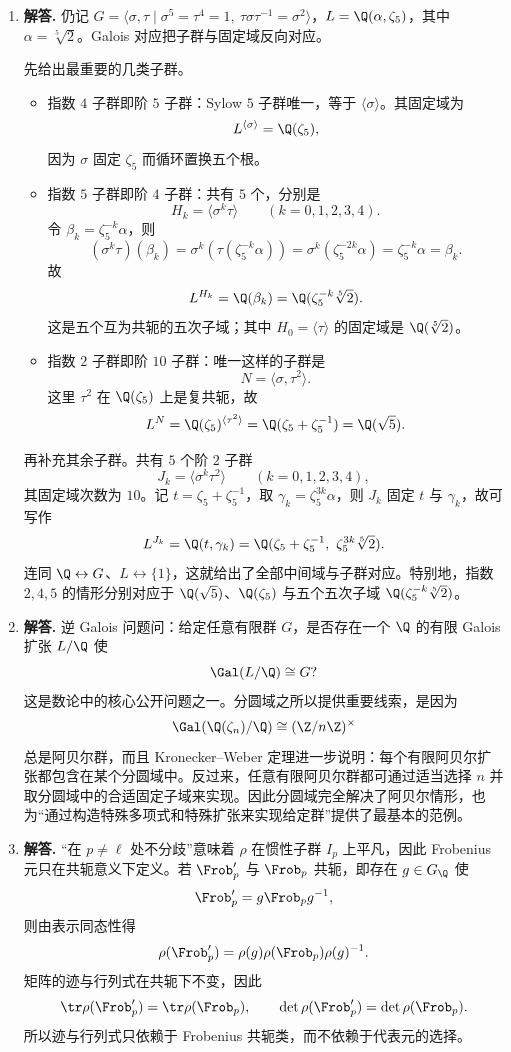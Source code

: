 \begin{enumerate}[label=\textbf{\arabic*.}, leftmargin=*, itemsep=1em]
\item \textbf{解答.} 仍记 $G=\langle\sigma,\tau\mid \sigma^5=\tau^4=1,\ \tau\sigma\tau^{-1}=\sigma^2\rangle$，$L=\Q(\alpha,\zeta_5)$，其中 $\alpha=\sqrt[5]{2}$。Galois 对应把子群与固定域反向对应。

先给出最重要的几类子群。
\begin{itemize}
\item 指数 $4$ 子群即阶 $5$ 子群：Sylow $5$ 子群唯一，等于 $\langle\sigma\rangle$。其固定域为
\[
L^{\langle\sigma\rangle}=\Q(\zeta_5),
\]
因为 $\sigma$ 固定 $\zeta_5$ 而循环置换五个根。
\item 指数 $5$ 子群即阶 $4$ 子群：共有 $5$ 个，分别是
\[
H_k=\langle \sigma^k\tau\rangle\qquad (k=0,1,2,3,4).
\]
令 $\beta_k=\zeta_5^{-k}\alpha$，则
\[
(\sigma^k\tau)(\beta_k)=\sigma^k(\tau(\zeta_5^{-k}\alpha))=\sigma^k(\zeta_5^{-2k}\alpha)=\zeta_5^{-k}\alpha=\beta_k.
\]
故
\[
L^{H_k}=\Q(\beta_k)=\Q(\zeta_5^{-k}\sqrt[5]{2}).
\]
这是五个互为共轭的五次子域；其中 $H_0=\langle\tau\rangle$ 的固定域是 $\Q(\sqrt[5]{2})$。
\item 指数 $2$ 子群即阶 $10$ 子群：唯一这样的子群是
\[
N=\langle\sigma,\tau^2\rangle.
\]
这里 $\tau^2$ 在 $\Q(\zeta_5)$ 上是复共轭，故
\[
L^N=\Q(\zeta_5)^{\langle\tau^2\rangle}=\Q(\zeta_5+\zeta_5^{-1})=\Q(\sqrt5).
\]
\end{itemize}

再补充其余子群。共有 $5$ 个阶 $2$ 子群
\[
J_k=\langle \sigma^k\tau^2\rangle\qquad (k=0,1,2,3,4),
\]
其固定域次数为 $10$。记 $t=\zeta_5+\zeta_5^{-1}$，取 $\gamma_k=\zeta_5^{3k}\alpha$，则 $J_k$ 固定 $t$ 与 $\gamma_k$，故可写作
\[
L^{J_k}=\Q(t,\gamma_k)=\Q(\zeta_5+\zeta_5^{-1},\ \zeta_5^{3k}\sqrt[5]{2}).
\]
连同 $\Q\leftrightarrow G$、$L\leftrightarrow\{1\}$，这就给出了全部中间域与子群对应。特别地，指数 $2,4,5$ 的情形分别对应于 $\Q(\sqrt5)$、$\Q(\zeta_5)$ 与五个五次子域 $\Q(\zeta_5^{-k}\sqrt[5]{2})$。

\item \textbf{解答.} 逆 Galois 问题问：给定任意有限群 $G$，是否存在一个 $\Q$ 的有限 Galois 扩张 $L/\Q$ 使
\[
\Gal(L/\Q)\cong G?
\]
这是数论中的核心公开问题之一。分圆域之所以提供重要线索，是因为
\[
\Gal(\Q(\zeta_n)/\Q)\cong (\Z/n\Z)^\times
\]
总是阿贝尔群，而且 Kronecker--Weber 定理进一步说明：每个有限阿贝尔扩张都包含在某个分圆域中。反过来，任意有限阿贝尔群都可通过适当选择 $n$ 并取分圆域中的合适固定子域来实现。因此分圆域完全解决了阿贝尔情形，也为“通过构造特殊多项式和特殊扩张来实现给定群”提供了最基本的范例。

\item \textbf{解答.} “在 $p\neq\ell$ 处不分歧”意味着 $\rho$ 在惯性子群 $I_p$ 上平凡，因此 Frobenius 元只在共轭意义下定义。若 $\Frob_p'$ 与 $\Frob_p$ 共轭，即存在 $g\in G_{\Q}$ 使
\[
\Frob_p'=g\Frob_p g^{-1},
\]
则由表示同态性得
\[
\rho(\Frob_p')=\rho(g)\rho(\Frob_p)\rho(g)^{-1}.
\]
矩阵的迹与行列式在共轭下不变，因此
\[
\tr\rho(\Frob_p')=\tr\rho(\Frob_p),
\qquad
\det\rho(\Frob_p')=\det\rho(\Frob_p).
\]
所以迹与行列式只依赖于 Frobenius 共轭类，而不依赖于代表元的选择。


\end{enumerate}
